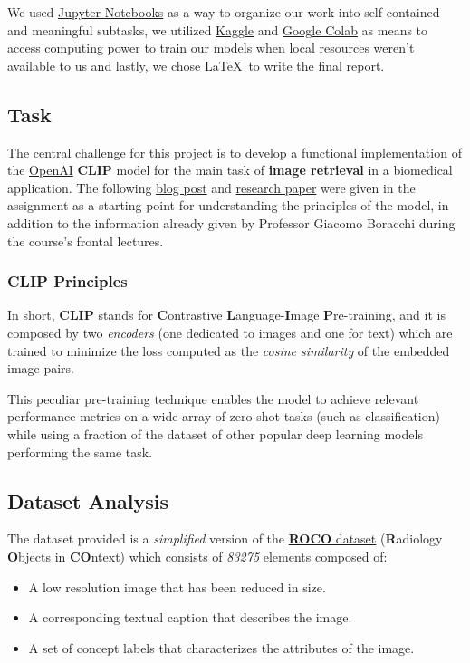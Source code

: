 \documentclass[10pt,twocolumn,letterpaper]{article}
\begin{document}
We used \href{https://jupyter.org/}{Jupyter Notebooks} as a way to organize our work into self-contained and meaningful subtasks, we utilized \href{https://www.kaggle.com/}{Kaggle} and \href{https://colab.research.google.com}{Google Colab} as means to access computing power to train our models when local resources weren't available to us and lastly, we chose \LaTeX~to write the final report.

\subsection{Task}
The central challenge for this project is to develop a functional implementation of the \href{https://openai.com/}{OpenAI} \textbf{CLIP} model for the main task of \textbf{image retrieval} in a biomedical application.
The following \href{https://openai.com/research/clip}{blog post} and \href{https://arxiv.org/pdf/2103.00020.pdf}{research paper} were given in the assignment as a starting point for understanding the principles of the model, in addition to the information already given by Professor Giacomo Boracchi during the course's frontal lectures.

\subsubsection*{CLIP Principles}
In short, \textbf{CLIP} stands for \textbf{C}ontrastive \textbf{L}anguage-\textbf{I}mage \textbf{P}re-training, and it is composed by two \textit{encoders} (one dedicated to images and one for text) which are trained to minimize the loss computed as the \textit{cosine similarity} of the embedded image pairs.

This peculiar pre-training technique enables the model to achieve relevant performance metrics on a wide array of zero-shot tasks (such as classification) while using a fraction of the dataset of other popular deep learning models performing the same task.

\subsection{Dataset Analysis}

The dataset provided is a \textit{simplified} version of the \href{https://link.springer.com/chapter/10.1007/978-3-030-01364-6_20}{\textbf{ROCO} dataset} (\textbf{R}adiology \textbf{O}bjects in \textbf{CO}ntext) which consists of \textit{83275} elements composed of:

\begin{itemize}
   \item A low resolution image that has been reduced in size.
   \item A corresponding textual caption that describes the image.
   \item A set of concept labels that characterizes the attributes of the image.
\end{itemize}
\end{document}
